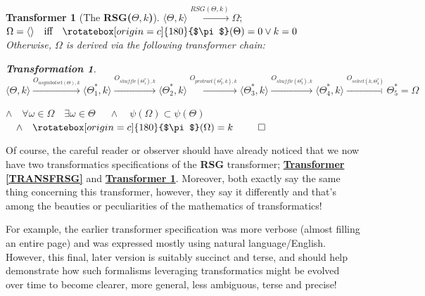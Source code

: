 \documentclass[a4paper, 18pt]{book} %
\newtheorem{trans}{Transformation}
\newtheorem{transf}{Transformer}
\newcommand{\invpi}{\rotatebox[origin=c]{180}{$\pi$}}
\begin{document}
\vspace{1em}
\begin{transf}[The \textbf{RSG($\Theta, k$)}]
\label{TRANSFRSGCORE}
$\langle \Theta, k \rangle \xrightarrow{RSG(\Theta,k)} \Omega;$\\
$\Omega = \langle \rangle \quad \text{iff} \quad \invpi(\Theta) = 0 \lor k = 0$\\
Otherwise, $\Omega$ is derived via the following transformer chain:
\begin{trans}
\label{TRANSRNGCHAIN}
$\langle \Theta, k \rangle \xrightarrow{O_{usymbolset(\Theta),k}}  \langle \Theta^*_1, k \rangle \xrightarrow{O_{shuffle(\Theta^*_1),k}} \langle \Theta^*_2, k \rangle \xrightarrow{O_{protract(\Theta^*_2,k),k}} \langle \Theta^*_3, k \rangle \xrightarrow{O_{shuffle(\Theta^*_3),k}} \langle \Theta^*_4, k \rangle \xrightarrow{O_{select(k,\Theta^*_4)}} \Theta^*_5 = \Omega$
\end{trans}
\vspace{1em}
$\land \quad \forall \omega \in \Omega \quad \exists \omega \in \Theta$
$\quad \land \quad \psi(\Omega) \subset \psi(\Theta)$
$\quad \land \quad \invpi(\Omega) = k$
$\qed$
\end{transf}
\vspace{2em}

Of course, the careful reader or observer should have already noticed that we now have two transformatics specifications of the \textbf{RSG} transformer; \textbf{\hyperref[TRANSFRSG]{Transformer \ref{TRANSFRSG}}} and \textbf{\hyperref[TRANSFRSGCORE]{Transformer \ref{TRANSFRSGCORE}}}. Moreover, both exactly say the same thing concerning this transformer, however, they say it differently and that's among the beauties or peculiarities of the mathematics of transformatics! 

For example, the earlier transformer specification was more verbose (almost filling an entire page) and was expressed mostly using natural language/English. However, this final, later version is suitably succinct and terse, and should help demonstrate how such formalisms leveraging transformatics might be evolved over time to become clearer, more general, less ambiguous, terse and precise! 
\end{document}
